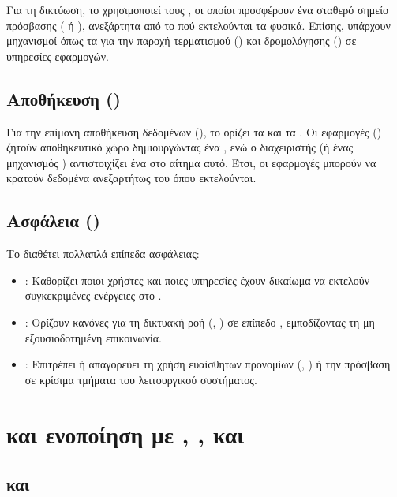 Για τη δικτύωση, το  χρησιμοποιεί τους , οι οποίοι προσφέρουν ένα σταθερό σημείο πρόσβασης ( ή ), ανεξάρτητα από το πού εκτελούνται τα  φυσικά. Επίσης, υπάρχουν μηχανισμοί όπως τα  για την παροχή  τερματισμού () και δρομολόγησης () σε υπηρεσίες εφαρμογών.

\subsection{Αποθήκευση ()}

Για την επίμονη αποθήκευση δεδομένων (), το  ορίζει τα  και τα . Οι εφαρμογές () ζητούν αποθηκευτικό χώρο δημιουργώντας ένα , ενώ ο διαχειριστής (ή ένας μηχανισμός ) αντιστοιχίζει ένα  στο αίτημα αυτό. Έτσι, οι εφαρμογές μπορούν να κρατούν δεδομένα ανεξαρτήτως του  όπου εκτελούνται.

\subsection{Ασφάλεια ()}

Το  διαθέτει πολλαπλά επίπεδα ασφάλειας:
\begin{itemize}
  \item \textbf{}: Καθορίζει ποιοι χρήστες και ποιες υπηρεσίες έχουν δικαίωμα να εκτελούν συγκεκριμένες ενέργειες στο .
  \item \textbf{}: Ορίζουν κανόνες για τη δικτυακή ροή (, ) σε επίπεδο , εμποδίζοντας τη μη εξουσιοδοτημένη επικοινωνία.
  \item \textbf{}: Επιτρέπει ή απαγορεύει τη χρήση ευαίσθητων προνομίων (, ) ή την πρόσβαση σε κρίσιμα τμήματα του λειτουργικού συστήματος.
\end{itemize}

\section{ και ενοποίηση με , ,  και }

\subsection{ και }


